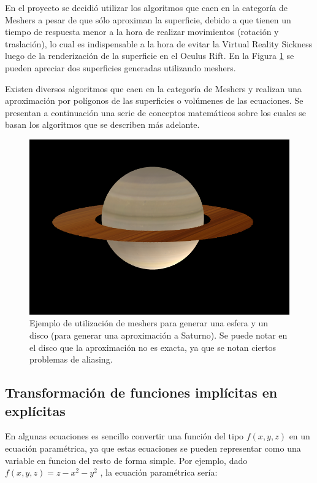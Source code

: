 \documentclass[12pt]{article}
\begin{document}
En el proyecto se decidió utilizar los algoritmos que caen en la categoría de Meshers\cite{mykola1}\cite{mykola2} a pesar de que sólo aproximan la superficie, debido a que tienen un tiempo de respuesta menor a la hora de realizar movimientos (rotación y traslación), lo cual es indispensable a la hora de evitar la Virtual Reality Sickness luego de la renderización de la superficie en el Oculus Rift. En la Figura \ref{saturno} se pueden apreciar dos superficies generadas utilizando meshers.

Existen diversos algoritmos que caen en la categoría de Meshers y realizan una aproximación por polígonos de las superficies o volúmenes de las ecuaciones. Se presentan a continuación una serie de conceptos matemáticos sobre los cuales se basan los algoritmos que se describen más adelante.
\begin{figure}[h]
\includegraphics[width=\textwidth]{saturno.png}
\caption{Ejemplo de utilización de meshers para generar una esfera y un disco (para generar una aproximación a Saturno). Se puede notar en el disco que la aproximación no es exacta, ya que se notan ciertos problemas de aliasing.}
\label{saturno}
\end{figure}
\clearpage

\subsection{Transformación de funciones implícitas en explícitas}
\noindent En algunas ecuaciones es sencillo convertir una función del tipo $f(x,y,z)$ en un ecuación paramétrica, ya que estas ecuaciones se pueden representar como una variable en funcion del resto de forma simple. Por ejemplo, dado $f(x,y,z)  = z- x^2 - y^2$ , la ecuación paramétrica sería: 
\end{document}
